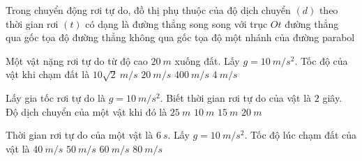 \begin{ex}%
Trong chuyển động rơi tự do, đồ thị phụ thuộc của độ dịch chuyển $(d)$ theo thời gian rơi $(t)$ có dạng là
\choice
{đường thẳng song song với trục $Ot$}
{đường thẳng qua gốc tọa độ}
{đường thẳng không qua gốc tọa độ}
{\True một nhánh của đường parabol}
 \end{ex}
\begin{ex}%
Một vật nặng rơi tự do từ độ cao $20\ m$ xuống đất. Lấy $g = 10\  m/s^2$. Tốc độ của vật khi chạm đất là
\choice
{$10\sqrt 2\   m/s$}
{\True $20\  m/s$}
{$400\  m/s$}
{$4\  m/s$}
 \end{ex}
\begin{ex}%
Lấy gia tốc rơi tự do là $g=10\ m/s^2$. Biết thời gian rơi tự do của vật là $2$ giây. Độ dịch chuyển của một vật khi đó là 	
\choice
{$25\ m$}
{$10\ m$}
{$15\ m$}
{\True $20\ m$}

\loigiai{
}
 \end{ex}
\begin{ex}%
Thời gian rơi tự do của một vật là $6\ s$. Lấy $g=10\ m/s^2$. Tốc độ lúc chạm đất của vật là
\choice
{$40\ m/s$}
{$50\ m/s$}
{\True $60\ m/s$}
{$80\ m/s$}
 \end{ex}

